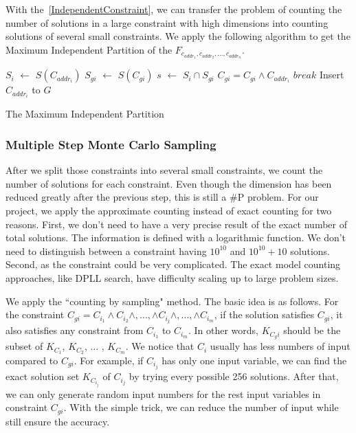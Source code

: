 With the~\ref{IndependentConstraint}, we can transfer the problem of counting the number of 
solutions in a large constraint with high
dimensions into counting solutions of 
several small constraints. We apply the following algorithm to get the Maximum Independent Partition
of the $F_{c_{addr_1},c_{addr_2},...,c_{addr_n}}$.

\IncMargin{1em}
\begin{algorithm}[h]
\DontPrintSemicolon
{}
{
   $S_i$ $\leftarrow$ $S(C_{addr_i})$ \;
   {
   $S_{gi}$ $\leftarrow$ $S(C_{gi})$ \;
   $s$ $\leftarrow$ $S_i \cap S_{gi}$  \;
   {
      $C_{gi} = C_{gi} \land C_{addr_i}$ \;
      $break$ \;
   }
   Insert $C_{{addr}_i}$ to $G$
   }
}
\caption{The Maximum Independent Partition}
\end{algorithm}
\DecMargin{1em}

\subsubsection{Multiple Step Monte Carlo Sampling}

After we split those constraints into several small constraints, we count
the number of solutions for each constraint. Even though the dimension
has been reduced greatly after the previous step, this is still a
\#P problem. For our project, we apply the approximate counting instead of
exact counting for two reasons. First, we don't need to have a very precise
result of the exact number of total solutions. The information is defined with
a logarithmic function. We don't need to distinguish between a constraint having
$10^{10}$ and $10^{10} + 10$ solutions.
Second, as the constraint could be very complicated. The exact model counting
approaches, like DPLL search, have difficulty scaling up to large problem sizes.

We apply the ``counting by sampling" method. The basic idea is as follows.
For the constraint $C_{gi}= C_{i_1} \land C_{i_2} \land ,..., \land C_{i_j} \land ,..., 
\land C_{i_m}$, 
if the solution satisfies $C_{gi}$, it also
satisfies any constraint from $C_{i_1}$ to $C_{i_m}$. In other words,
$K_{C_gi}$ should be the subset of $K_{C_1}$, $K_{C_2}$, ... , $K_{C_m}$.
We notice that $C_i$ usually has less numbers of input compared to $C_{gi}$.
For example, if $C_{i_j}$ has only one input variable, we can find the exact
solution set $K_{C_{i_j}}$ of $C_{i_j}$ by trying every possible 256 solutions. After that,
we can only generate random input numbers for the rest input variables in 
constraint $C_{gi}$. With the simple trick, we can reduce the number of input while
still ensure the accuracy.

